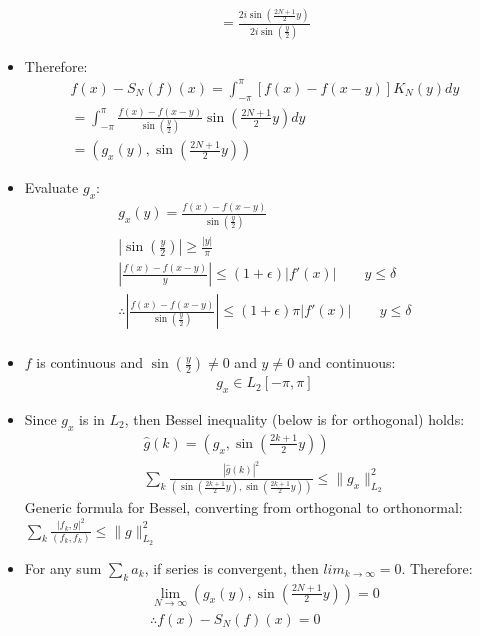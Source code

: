 \documentclass[12pt, a4paper]{article}
\begin{document}
\begin{itemize}
\begin{gather*}
        = \frac{2i\sin{\left(\frac{2N+1}{2}y\right)}}{2i\sin{\left(\frac{y}{2}\right)}}
    \end{gather*}
    \item Therefore:
    \begin{gather*}
        f(x)-S_N(f)(x)=\int_{-\pi}^\pi [f(x) - f(x-y)]K_N(y)dy\\
        = \int_{-\pi}^\pi \frac{f(x) - f(x-y)}{\sin{\left(\frac{y}{2}\right)}}\sin{\left(\frac{2N+1}{2}y\right)}dy\\
        = \left(g_x(y), \sin{\left(\frac{2N+1}{2}y\right)}\right)
    \end{gather*}
    \item Evaluate $g_x$:
    \begin{gather*}
        g_x(y) = \frac{f(x) - f(x-y)}{\sin{\left(\frac{y}{2}\right)}}\\
        |\sin(\frac{y}{2})| \geq \frac{|y|}{\pi}\\
        \left|\frac{f(x) - f(x-y)}{y}\right| \leq  (1+\epsilon)|f'(x)| \qquad y \leq \delta\\
        \therefore \left|\frac{f(x) - f(x-y)}{\sin{\left(\frac{y}{2}\right)}}\right| \leq (1+\epsilon)\pi |f'(x)| \qquad y \leq \delta\\
    \end{gather*}
    \item $f$ is continuous and $\sin(\frac{y}{2}) \ne 0$ and $y\ne0$ and continuous: 
    \begin{gather*}
        g_x \in L_2[-\pi, \pi]
    \end{gather*} 
    \item Since $g_x$ is in $L_2$, then Bessel inequality (below is for orthogonal) holds:
    \begin{gather*}
        \hat{g}(k) = \left(g_x, \sin{\left(\frac{2k+1}{2}y\right)}\right)\\
        \sum_k\frac{|\hat{g}(k)|^2}{\left(\sin{\left(\frac{2k+1}{2}y\right)}, \sin{\left(\frac{2k+1}{2}y\right)}\right)} \leq \|g_x\|^2_{L_2}
    \end{gather*}
    {\tiny Generic formula for Bessel, converting from orthogonal to orthonormal: $\sum_k\frac{|f_k, g|^2}{(f_k, f_k)} \leq \|g\|^2_{L_2}$}
    \item For any sum $\sum_k a_k$, if series is convergent, then $lim_{k\to\infty} = 0$. Therefore:
    \begin{gather*}
        \lim_{N\to\infty}\left(g_x(y), \sin{\left(\frac{2N+1}{2}y\right)}\right) = 0\\
        \therefore f(x)-S_N(f)(x) = 0
    \end{gather*}
\end{itemize}   
\end{document}
